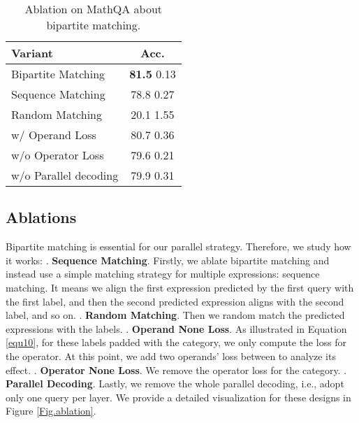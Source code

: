 \documentclass[11pt]{article}
\begin{document}
\begin{table}[t]\small
\renewcommand\arraystretch{1.15}
\centering
\setlength\tabcolsep{2pt}\begin{tabular}{l c }
\toprule
     \textbf{Variant} & \textbf{Acc.} \\
\midrule[0.25pt]
                         Bipartite Matching            &\textbf{81.5 } \scriptsize  0.13       \\ 

Sequence Matching                      &78.8  \scriptsize  0.27 \\
Random Matching                    &20.1  \scriptsize   1.55 \\
w/ Operand  Loss                      &80.7   \scriptsize  0.36  \\
w/o Operator  Loss                      &79.6   \scriptsize  0.21  \\
w/o Parallel decoding  &79.9   \scriptsize  0.31  \\
\bottomrule
\end{tabular}
\caption{Ablation on MathQA about bipartite matching.}
\label{ablation_table}
\end{table} \subsection{Ablations}
Bipartite matching is essential for our parallel strategy. Therefore, we study how it works:
\uppercase\expandafter{}. \textbf{Sequence Matching}. Firstly, we ablate bipartite matching and instead use a simple matching strategy for multiple expressions: sequence matching. It means we align the first expression predicted by the first query with the first label, and then the second predicted expression aligns with the second label, and so on. \uppercase\expandafter{}. \textbf{Random Matching}. Then we random match the predicted expressions with the labels. \uppercase\expandafter{}. \textbf{Operand None Loss}. As illustrated in Equation \ref{equ10}, for these labels padded with the  category, we only compute the loss for the operator. At this point, we add two operands' loss between  to analyze its effect. \uppercase\expandafter{}. \textbf{Operator None Loss}. We remove the operator loss for the  category. \uppercase\expandafter{}. \textbf{Parallel Decoding}. Lastly, we remove the whole parallel decoding, i.e., adopt only one query per layer. We provide a detailed visualization for these designs in Figure \ref{Fig.ablation}.  
\end{document}
